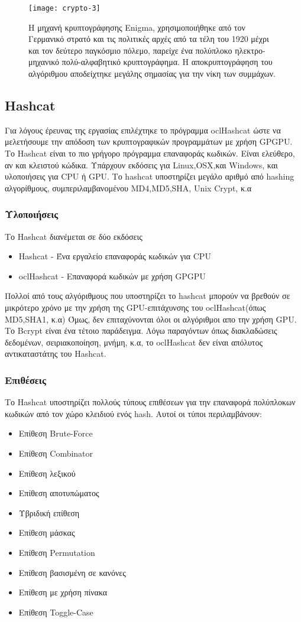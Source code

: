 \begin{figure}[h]
\centering
\texttt{[image: crypto-3]}
\caption{Η μηχανή κρυπτογράφησης Enigma, χρησιμοποιήθηκε από τον Γερμανικό στρατό και τις πολιτικές αρχές από τα τέλη του 1920 μέχρι και τον δεύτερο παγκόσμιο πόλεμο, παρείχε ένα πολύπλοκο ηλεκτρο-μηχανικό πολύ-αλφαβητικό κρυπτογράφημα. H αποκρυπτογράφηση του αλγόριθμου αποδείχτηκε μεγάλης σημασίας για την νίκη των συμμάχων.}
\end{figure}

\subsection{Hashcat}
Για λόγους έρευνας της εργασίας επιλέχτηκε το πρόγραμμα oclHashcat ώστε να μελετήσουμε την απόδοση των κρυπτογραφικών προγραμμάτων με χρήση GPGPU. Το Hashcat είναι το πιο γρήγορο πρόγραμμα επαναφοράς κωδικών. Είναι ελεύθερο, αν και κλειστού κώδικα. Υπάρχουν εκδόσεις για Linux,OSX,και Windows, και υλοποιήσεις για CPU ή GPU. Το hashcat υποστηρίζει μεγάλο αριθμό από hashing αλγορίθμους, συμπεριλαμβανομένου MD4,MD5,SHA, Unix Crypt, κ.α
\subsubsection{Υλοποιήσεις}
Το Hashcat διανέμεται σε δύο εκδόσεις
\begin{itemize}
\item Hashcat - Ένα εργαλείο επαναφοράς κωδικών για CPU
\item oclHashcat - Επαναφορά κωδικών με χρήση GPGPU
\end{itemize}

Πολλοί από τους αλγόριθμους που υποστηρίζει το hashcat μπορούν να βρεθούν σε μικρότερο χρόνο με την χρήση της GPU-επιτάχυνσης του oclHashcat(όπως MD5,SHA1, κ.α) Όμως, δεν επιταχύνονται όλοι οι αλγόριθμοι απο την χρήση GPU. Το Bcrypt είναι ένα τέτοιο παράδειγμα. Λόγω παραγόντων όπως διακλαδώσεις δεδομένων, σειριακοποίηση, μνήμη, κ.α, το oclHashcat δεν είναι απόλυτος αντικαταστάτης του Hashcat.

\subsubsection{Επιθέσεις}
Το Hashcat υποστηρίζει πολλούς τύπους επιθέσεων για την επαναφορά πολύπλοκων κωδικών από τον χώρο κλειδιού ενός hash. Αυτοί οι τύποι περιλαμβάνουν:
\begin{itemize}
\item Επίθεση Brute-Force
\item Επίθεση Combinator
\item Επίθεση λεξικού
\item Επίθεση αποτυπώματος
\item Υβριδική επίθεση
\item Επίθεση μάσκας
\item Επίθεση Permutation
\item Επίθεση βασισμένη σε κανόνες
\item Επίθεση με χρήση πίνακα
\item Επίθεση Toggle-Case
\end{itemize}



